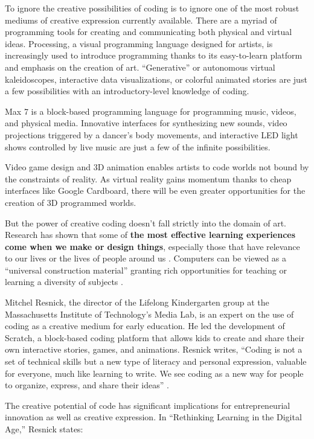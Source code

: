 To ignore the creative possibilities of coding is to ignore one of the most robust mediums of creative expression currently available. There are a myriad of programming tools for creating and communicating both physical and virtual ideas. Processing, a visual programming language designed for artists, is increasingly used to introduce programming thanks to its easy-to-learn platform and emphasis on the creation of art. ``Generative'' or autonomous virtual kaleidoscopes, interactive data visualizations, or colorful animated stories are just a few possibilities with an introductory-level knowledge of coding. \par
Max 7 is a block-based programming language for programming music, videos, and physical media. Innovative interfaces for synthesizing new sounds, video projections triggered by a dancer's body movements, and interactive LED light shows controlled by live music are just a few of the infinite possibilities. \par
Video game design and 3D animation enables artists to code worlds not bound by the constraints of reality. As virtual reality gains momentum thanks to cheap interfaces like Google Cardboard, there will be even greater opportunities for the creation of 3D programmed worlds. \par  
But the power of creative coding doesn't fall strictly into the domain of art. Research has shown that some of \textbf{the most effective learning experiences come when we make or design things}, especially those that have relevance to our lives or the lives of people around us \cite{papert1}. Computers can be viewed as a ``universal construction material'' granting rich opportunities for teaching or learning a diversity of subjects \cite{res98}. \par
Mitchel Resnick, the director of the Lifelong Kindergarten group at the Massachusetts Institute of Technology's Media Lab, is an expert on the use of coding as a creative medium for early education. He led the development of Scratch, a block-based coding platform that allows kids to create and share their own interactive stories, games, and animations. Resnick writes, ``Coding is not a set of technical skills but a new type of literacy and personal expression, valuable for everyone, much like learning to write. We see coding as a new way for people to organize, express, and share their ideas'' \cite{resonline}. \par
The creative potential of code has significant implications for entrepreneurial innovation as well as creative expression. In ``Rethinking Learning in the Digital Age,'' Resnick states:
